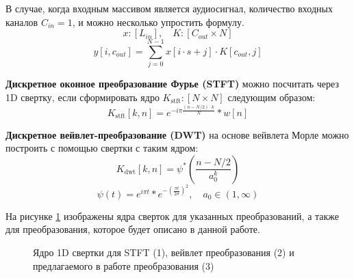В случае, когда входным массивом является аудиосигнал, количество входных каналов $C_{in} = 1$, и можно несколько упростить формулу. 
\[x: [L_{in}], \quad K: [C_{out} \times N]\]
\begin{equation}
	y[i, c_{out}] = \sum_{j=0}^{N-1} x[i \cdot s + j] \cdot K[c_{out}, j]
\end{equation}


\textbf{Дискретное оконное преобразование Фурье (STFT)} можно посчитать через 1D свертку, если сформировать ядро $K_{\mathrm{stft}}: [N \times N]$ следующим образом:
\begin{equation}
	K_{\mathrm{stft}}[k, n] = e^{-i\pi \frac{(n - N/2) \cdot k}{N}} * w[n]
\end{equation}

\textbf{Дискретное вейвлет-преобразование (DWT)} на основе вейвлета Морле можно построить с помощью свертки с таким ядром:
\begin{equation}
	K_{\mathrm{dwt}}[k, n] = \psi^* \left(\frac{n - N/2}{a_0^k}\right)
\end{equation}
\[\psi(t) = e^{i\pi t} * e^{-\left(\frac{\pi t}{2\sigma}\right)^2}, \quad   a_0 \in (1, \infty)\]

На рисунке \ref{fig:stft_kernel} изображены ядра сверток для указанных преобразований, а также для преобразования, которое будет описано в данной работе.

\begin{figure}
  \centering
  \caption{Ядро 1D свертки для STFT (1), вейвлет преобразования (2) и предлагаемого в работе преобразования (3)}
  \label{fig:stft_kernel}
\end{figure}


